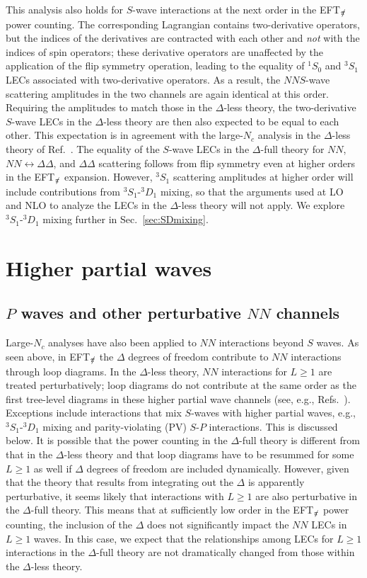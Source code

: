 \documentclass[nofootinbib, preprint, aps, prc, superscriptaddress,11pt]{revtex4-1}
\newcommand{\Nc}{\ensuremath{N_c}\xspace}
\newcommand{\NN}{\ensuremath{N\!N}\xspace}
\newcommand{\oneS}{\ensuremath{{{}^{1}\!S_0}}\xspace}
\newcommand{\threeS}{\ensuremath{{{}^{3}\!S_1}}\xspace}
\newcommand{\threeD}{\ensuremath{{{}^{3}\!D_1}}\xspace}
\newcommand\Swave{$S$-wave\xspace}
\newcommand\SD{\ensuremath{\threeS\text{-}\threeD}\xspace}
\newcommand\SP{\ensuremath{S\text{-}P}\xspace}
\newcommand{\1}{\mathbbm{1}}
\newcommand{\nopi}{\ensuremath{\pi\hskip-0.40em /}}
\newcommand{\eftnopi}{EFT$_{\nopi}$\xspace}
\newcommand{\D}{\ensuremath{\Delta}\xspace}
\newcommand{\DD}{\ensuremath{\Delta\Delta}\xspace}
\begin{document}
This analysis also holds for \Swave interactions at the next  order in the \eftnopi power counting. 
The corresponding Lagrangian contains two-derivative operators, but the indices of the derivatives are contracted with each other and \emph{not} with the indices of spin operators; these derivative operators are unaffected by the application of the flip symmetry operation, leading to the equality of \oneS and \threeS LECs associated with two-derivative operators. 
As a result, the \NN \Swave scattering amplitudes in the two channels are again identical at this order. Requiring the amplitudes to match those in the \D-less theory, the two-derivative \Swave LECs in the \D-less theory are then also expected to be equal to each other.
This expectation is in agreement with the large-\Nc analysis in the \D-less theory of Ref.~\cite{Schindler:2018irz}. 
The equality of the \Swave LECs in the \D-full theory for $NN$, $NN \leftrightarrow \D \D$, and $\DD$ scattering follows from flip symmetry even at higher orders in the \eftnopi expansion. However, \threeS scattering amplitudes at higher order will include contributions from \SD mixing, so that the arguments used at LO and NLO to analyze the LECs in the \D-less theory will not apply. We explore \SD mixing further in Sec.~\ref{sec:SDmixing}.




\section{Higher partial waves}
\label{sec:Higher}

\subsection{$P$ waves and other perturbative \NN channels}
\label{sec:Pwaves}

Large-\Nc analyses have also been applied to \NN interactions beyond $S$ waves. 
As seen above, in \eftnopi the \D degrees of freedom contribute to  \NN interactions through loop diagrams. 
In the \D-less theory, \NN interactions for 
$L \ge 1$ are treated perturbatively; loop diagrams  do not contribute at the same order as the first tree-level diagrams in these higher partial wave channels (see, e.g., Refs.~\cite{Kaplan:1998sz,Rupak:1999rk}). 
Exceptions include interactions that mix {\Swave}s with higher partial waves, e.g., \SD mixing and parity-violating (PV) \SP interactions. This is discussed below.
It is possible that the power counting in the \D-full theory is different from that in the \D-less theory and that loop diagrams have to be resummed for some $L \ge 1$ as well if \D degrees of freedom are included dynamically. 
However, given that the theory that results from integrating out the \D is apparently perturbative, it seems likely that interactions with $L \ge 1$ are also perturbative in the \D-full theory.
This means that at sufficiently low order in the \eftnopi power counting, the inclusion of the \D does not significantly impact the \NN LECs in $L\ge 1$ waves. 
In this case, we expect that the relationships among LECs for $L\ge 1$ interactions in the \D-full theory are not dramatically changed from those within the \D-less theory.
\end{document}
